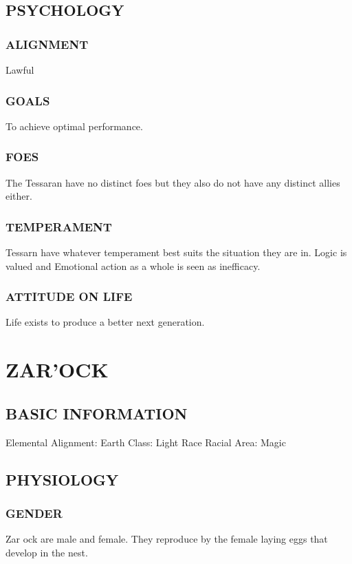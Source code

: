 \subsection{PSYCHOLOGY}
\subsubsection{ALIGNMENT}
Lawful
\subsubsection{GOALS}
To achieve optimal performance.
\subsubsection{FOES}
The Tessaran have no distinct foes but they also do not have any distinct
allies either.
\subsubsection{TEMPERAMENT}
Tessarn have whatever temperament best suits the situation they are in.  Logic
is valued and Emotional action as a whole is seen as inefficacy.
\subsubsection{ATTITUDE ON LIFE}
Life exists to produce a better next generation.
\section{ZAR'OCK}
\subsection{BASIC INFORMATION}
Elemental Alignment: Earth
Class: Light Race
Racial Area: Magic
\subsection{PHYSIOLOGY}
\subsubsection{GENDER} 
Zar ock are male and female.  They reproduce by the female laying eggs that
develop in the nest.
